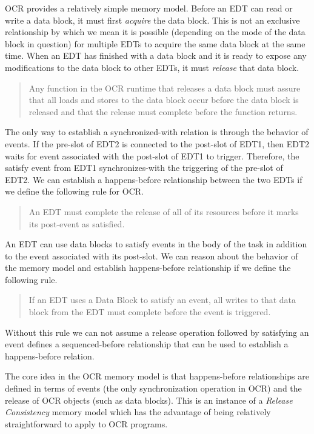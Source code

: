 OCR provides a relatively simple memory model. Before an EDT can read
or write a data block, it must first \emph{acquire} the data
block. This is not an exclusive relationship by which we mean it is
possible (depending on the mode of the data block in question) for
multiple EDTs to acquire the same data block at the same
time.  When an EDT has finished with a data block and it is ready
to expose any modifications to the data block to other EDTs, it
must \emph{release} that data block.

\begin{quote}
Any function in the OCR runtime that releases a data block must assure
that all loads and stores to the data block occur before the data
block is released and that the release must complete before the
function returns.
\end{quote}

The only way to establish a synchronized-with relation is through the
behavior of events. If the pre-slot of EDT2 is connected to the post-slot
of EDT1, then EDT2 waits for event associated with the post-slot of EDT1 to
trigger. Therefore, the satisfy event from EDT1 synchronizes-with the
triggering of the pre-slot of EDT2. We can establish a happens-before
relationship between the two EDTs if we define the following rule for
OCR.

\begin{quote}
An EDT must complete the release of all of its resources before it
marks its post-event as satisfied.
\end{quote}

An EDT can use data blocks to satisfy events in the body of the task
in addition to the event associated with its post-slot. We can reason
about the behavior of the memory model and establish happens-before
relationship if we define the following rule.

\begin{quote}
If an EDT uses a Data Block to satisfy an event, all writes to that data block
from the EDT must complete before the event is triggered.
\end{quote}

Without this rule we can not assume a release operation followed by
satisfying an event defines a sequenced-before relationship that can
be used to establish a happens-before relation.

The core idea in the OCR memory model is that happens-before
relationships are defined in terms of events (the only synchronization
operation in OCR) and the release of OCR objects (such as data
blocks). This is an instance of a \emph{Release
Consistency} memory model which has the
advantage of being relatively straightforward to apply to OCR
programs.

